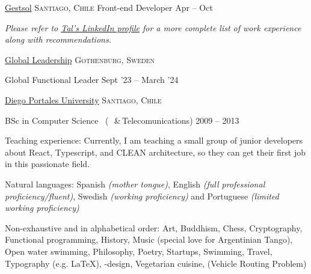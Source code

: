 \documentclass[10pt,a4paper]{article}
\begin{document}
\headedsection
  {\href{http://www.gestsol.cl}{Gestsol}}
  {\textsc{Santiago, Chile}} {%
  \headedsubsection
    {Front-end Developer}
    {Apr -- Oct }
    {}
}


\vspace{-0.2em}
\begin{center}
  \emph{\small Please refer to \href{https://www.linkedin.com/in/tali-berenstein-torres-94055726b/}{Tal's LinkedIn profile} for a more complete list of work experience along with recommendations.}
\end{center}


\spacedhrule{-0.2em}{-0.4em}


\headedsection
  {\href{https://www.globalleadership.com/en/l}{Global Leadership}}
  {\textsc{Gothenburg, Sweden}} {%
  \headedsubsection
    {Global Functional Leader}
    {Sept '23 -- March '24}
    
}

\headedsection
  {\href{http://www.udp.cl}{Diego Portales University}}
  {\textsc{Santiago, Chile}} {%
  \headedsubsection
    {BSc in Computer Science \textnormal{~(~\,\&\,Telecomunications)}}
    {2009 -- 2013}
    
}


\spacedhrule{0.5em}{-0.4em}


\inlineheadsection  %
  {Teaching experience:}
  {  Currently, I am teaching a small group of junior developers about React, Typescript, and CLEAN architecture, so they can get their first job in this passionate field. }

\vspace{0.5em}
\inlineheadsection
  {Natural languages:}
  {Spanish \emph{(mother tongue)}, English \emph{(full professional proficiency/fluent)}, Swedish \emph{(working proficiency)} and Portuguese \emph{(limited working proficiency)} }


\spacedhrule{1.6em}{-0.4em}


\inlineheadsection
  {Non-exhaustive and in alphabetical order:}
  {Art, Buddhism, Chess, Cryptography, Functional programming, History, Music (special love for Argentinian Tango), Open water swimming, Philosophy, Poetry, Startups, Swimming, Travel, Typography (e.g. \LaTeX), -design, Vegetarian cuisine,  (Vehicle Routing Problem)}
\end{document}
